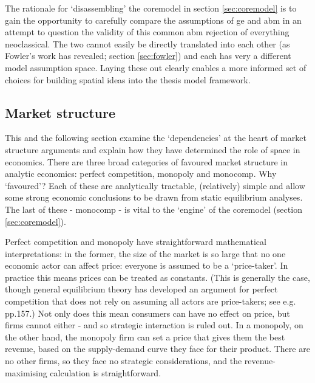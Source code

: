 The rationale for `disassembling' the \gls{coremodel} in section \ref{sec:coremodel} is to gain the opportunity to carefully compare the assumptions of \gls{ge} and \gls{abm} in an attempt to question the validity of this common \gls{abm} rejection of everything neoclassical. The two cannot easily be directly translated into each other (as Fowler's work has revealed; section \ref{sec:fowler}) and each has very a different model assumption space. Laying these out clearly enables a more informed set of choices for building spatial ideas into the thesis model framework.

\subsection{Market structure \label{sec:marketstructure}}

This and the following section examine the `dependencies' at the heart of market structure arguments and explain how they have determined the role of space in economics. There are three broad categories of favoured market structure in analytic economics: perfect competition, monopoly and \gls{monocomp}. Why `favoured'? Each of these are analytically tractable, (relatively) simple and allow some strong economic conclusions to be drawn from static equilibrium analyses. The last of these - \gls{monocomp} - is vital to the `engine' of the \gls{coremodel} (section \ref{sec:coremodel}).


Perfect competition and monopoly have straightforward mathematical interpretations: in the former, the size of the market is so large that no one economic actor can affect price: everyone is assumed to be a `price-taker'. In practice this means prices can be treated as constants. (This is generally the case, though general equilibrium theory has developed an argument for perfect competition that does not rely on assuming all actors are price-takers; see e.g. \citealt{starr_general_1997} pp.157.) Not only does this mean consumers can have no effect on price, but firms cannot either - and so strategic interaction is ruled out. In a monopoly, on the other hand, the monopoly firm can set a price that gives them the best revenue, based on the supply-demand curve they face for their product. There are no other firms, so they face no strategic considerations, and the revenue-maximising calculation is straightforward.

